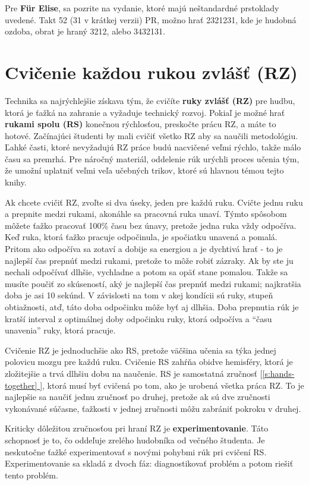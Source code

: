 \documentclass[11pt,a4paper]{book}
\newcommand*{\fullref}[1]{\hyperref[{#1}]{\ref*{#1} \nameref*{#1}}} %
\newcommand*{\fullrefp}[1]{[\fullref{#1}]} %
\begin{document}
Pre \textbf{Für Elise}, sa pozrite na vydanie, ktoré majú neštandardné prstoklady uvedené. Takt 52 (31 v krátkej verzii) PR, možno hrať 2321231, kde je hudobná ozdoba, obrat je hraný 3212, alebo 3432131. 

\section{Cvičenie každou rukou zvlášť (RZ)}\label{s:hands-separate}
Technika sa najrýchlejšie získava tým, že cvičíte \textbf{ruky zvlášť (RZ)} pre hudbu, ktorá je ťažká na zahranie a vyžaduje technický rozvoj. Pokiaľ je možné hrať \textbf{rukami spolu (RS)} konečnou rýchlosťou, preskočte prácu RZ, a máte to hotové. Začínajúci študenti by mali cvičiť všetko RZ aby sa naučili metodológiu. Ľahké časti, ktoré nevyžadujú RZ práce budú nacvičené veľmi rýchlo, takže málo času sa premrhá. Pre náročný materiál, oddelenie rúk urýchli proces učenia tým, že umožní uplatniť veľmi veľa učebných  trikov, ktoré sú hlavnou témou tejto knihy.

Ak chcete cvičiť RZ, zvoľte si dva úseky, jeden pre každú ruku. Cvičte jednu ruku a prepnite medzi rukami, akonáhle sa pracovná ruka unaví. Týmto spôsobom môžete ťažko pracovať 100\% času bez únavy, pretože jedna ruka vždy odpočíva. Keď ruka, ktorá ťažko pracuje odpočinula, je spočiatku unavená a pomalá. Pritom ako odpočíva sa zotaví a dobije sa energiou a je dychtivá hrať - to je najlepší čas prepnúť medzi rukami, pretože to môže robiť zázraky. Ak by ste ju nechali odpočívať dlhšie, vychladne a potom sa opäť stane pomalou. Takže sa musíte poučiť zo skúseností, aký je najlepší čas prepnúť medzi rukami; najkratšia doba je asi 10 sekúnd. V závislosti na tom v akej kondícii sú ruky, stupeň obtiažnosti, atď, táto doba odpočinku môže byť aj dlhšia. Doba prepnutia rúk je kratší interval z optimálnej doby odpočinku ruky, ktorá odpočíva a “času unavenia” ruky, ktorá pracuje.

Cvičenie RZ je jednoduchšie ako RS, pretože väčšina učenia sa týka jednej polovicu mozgu pre každú ruku. Cvičenie RS zahŕňa obidve hemisféry, ktorá je zložitejšie a trvá dlhšiu dobu na naučenie. RS je samostatná zručnosť \fullrefp{s:hands-together}, ktorá musí byť cvičená po tom, ako je urobená všetka práca RZ. To je najlepšie sa naučiť jednu zručnosť po druhej, pretože ak sú dve zručnosti vykonávané súčasne, ťažkosti v jednej zručnosti môžu zabrániť pokroku v druhej.

Kriticky dôležitou zručnosťou pri hraní RZ je \textbf{experimentovanie}. Táto schopnosť je to, čo oddeľuje zrelého hudobníka od večného študenta. Je neskutočne ťažké experimentovať s novými pohybmi rúk pri cvičení RS. Experimentovanie sa skladá z dvoch fáz: diagnostikovať problém a potom riešiť tento problém.
\end{document}
